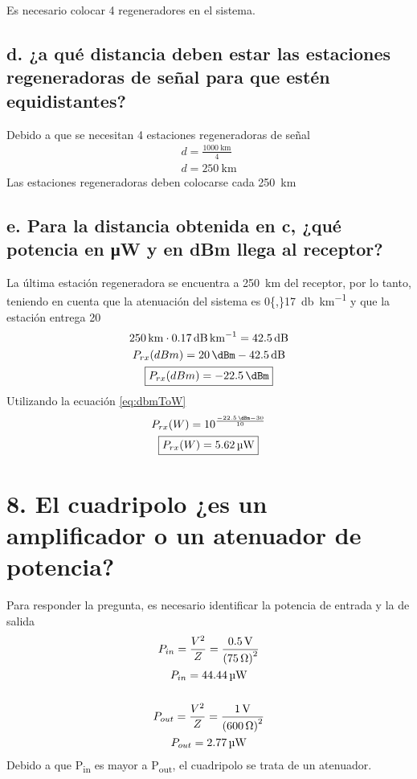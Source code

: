 \documentclass[11pt,a4paper]{article}
\begin{document}
Es necesario colocar 4 regeneradores en el sistema.

\subsection*{d. ¿a qué distancia deben estar las estaciones regeneradoras de señal para que
estén equidistantes?}
Debido a que se necesitan 4 estaciones regeneradoras de señal
\[
    \begin{gathered}
        d = \frac{\SI{1000}{\kilo\meter}}{4} \\
        \boxed{d = \SI{250}{\kilo\meter}}
    \end{gathered}
\]
Las estaciones regeneradoras deben colocarse cada \SI{250}{\kilo\meter}

\subsection*{e. Para la distancia obtenida en c, ¿qué potencia en μW y en dBm llega al
receptor?}
La última estación regeneradora se encuentra a \SI{250}{\kilo\meter} del receptor, por lo
tanto, teniendo en cuenta que la atenuación del sistema es
\SI{0{,}17}{\decibel\per\kilo\meter} y que la estación entrega \SI{20}{\dBm}
\[
    \begin{gathered}
        \SI{250}{\kilo\meter} \cdot \SI{0{,}17}{\decibel\per\kilo\meter} =
        \SI{42{,}5}{\decibel} \\
        P_{rx}(dBm) = \SI{20}{\dBm} - \SI{42{,}5}{\decibel} \\
        \boxed{P_{rx}(dBm) = \SI{-22{,}5}{\dBm}}
    \end{gathered}
\]
Utilizando la ecuación \eqref{eq:dbmToW}
\[
    \begin{gathered}
        P_{rx}(W) = 10^{\frac{\SI{-22{,}5}{\dBm} - 30}{10}} \\
        \boxed{P_{rx}(W) = \SI{5{,}62}{\micro\watt}}
    \end{gathered}
\]

\section*{8. El cuadripolo ¿es un amplificador o un atenuador de potencia?}
Para responder la pregunta, es necesario identificar la potencia de entrada y la de salida
\[
    \begin{gathered}
        P_{in} = \frac{V^2}{Z} = \frac{\SI{0{,}5}{\volt}}{\left(\SI{75}{\ohm} \right)^2} \\
        P_{in} = \SI{44{,}44}{\micro\watt} \\[5mm]
        P_{out} = \frac{V^2}{Z} = \frac{\SI{1}{\volt}}{\left(\SI{600}{\ohm} \right)^2} \\
        P_{out} = \SI{2{,}77}{\micro\watt}
    \end{gathered}
\]
Debido a que P\textsubscript{in} es mayor a P\textsubscript{out}, el cuadripolo se trata
de un atenuador.
\end{document}
